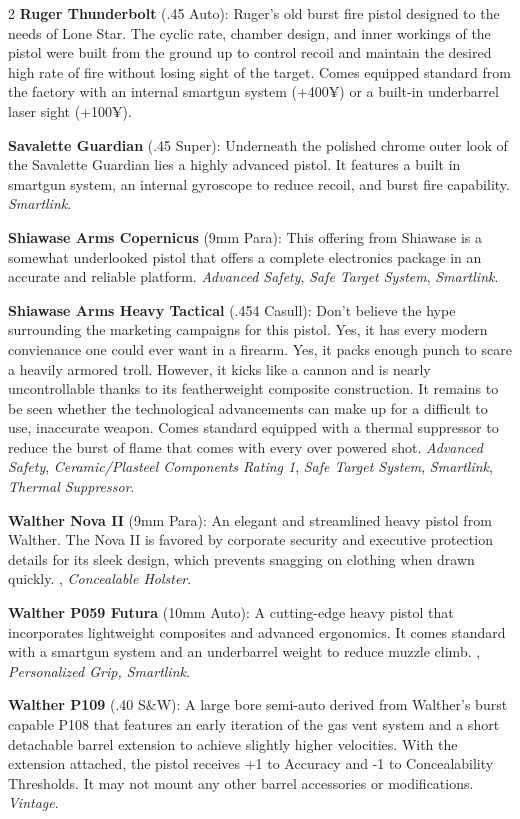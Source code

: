 \documentclass[
  oneside]{article}
\begin{document}
\begin{multicols}{2}
\textbf{Ruger Thunderbolt} (.45 Auto): Ruger's old
burst fire pistol designed to the needs of Lone
Star. The cyclic rate, chamber design, and inner
workings of the pistol were built from the ground
up to control recoil and maintain the desired high
rate of fire without losing sight of the target.
Comes equipped standard from the factory with an
internal smartgun system (+400¥) or a built-in
underbarrel laser sight (+100¥).

\textbf{Savalette Guardian} (.45 Super):
Underneath the polished chrome outer look of the
Savalette Guardian lies a highly advanced pistol.
It features a built in smartgun system, an
internal gyroscope to reduce recoil, and burst
fire capability. \emph{Smartlink}.

\textbf{Shiawase Arms Copernicus} (9mm Para): This
offering from Shiawase is a somewhat underlooked
pistol that offers a complete electronics package
in an accurate and reliable platform.
\emph{Advanced Safety}, \emph{Safe Target System},
\emph{Smartlink}.

\textbf{Shiawase Arms Heavy Tactical} (.454
Casull): Don't believe the hype surrounding the
marketing campaigns for this pistol. Yes, it has
every modern convienance one could ever want in a
firearm. Yes, it packs enough punch to scare a
heavily armored troll. However, it kicks like a
cannon and is nearly uncontrollable thanks to its
featherweight composite construction. It remains
to be seen whether the technological advancements
can make up for a difficult to use, inaccurate
weapon. Comes standard equipped with a thermal
suppressor to reduce the burst of flame that comes
with every over powered shot. \emph{Advanced
Safety}, \emph{Ceramic/Plasteel Components Rating
1}, \emph{Safe Target System}, \emph{Smartlink},
\emph{Thermal Suppressor}.

\textbf{Walther Nova II} (9mm Para): An elegant
and streamlined heavy pistol from Walther. The
Nova II is favored by corporate security and
executive protection details for its sleek design,
which prevents snagging on clothing when drawn
quickly. , \emph{Concealable Holster}.

\textbf{Walther P059 Futura} (10mm Auto): A
cutting-edge heavy pistol that incorporates
lightweight composites and advanced ergonomics. It
comes standard with a smartgun system and an
underbarrel weight to reduce muzzle climb. ,
\emph{Personalized Grip, Smartlink}.

\textbf{Walther P109} (.40 S\&W): A large bore
semi-auto derived from Walther's burst capable
P108 that features an early iteration of the gas
vent system and a short detachable barrel
extension to achieve slightly higher velocities.
With the extension attached, the pistol receives
+1 to Accuracy and -1 to Concealability
Thresholds. It may not mount any other barrel
accessories or modifications. \emph{Vintage}.


\end{multicols}
\end{document}

